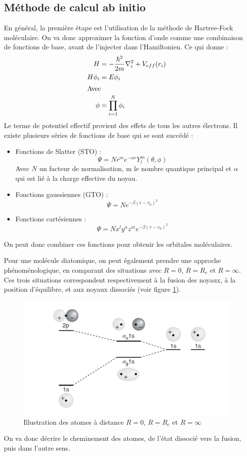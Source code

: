\subsection{Méthode de calcul ab initio}


En général, la première étape est l'utilisation de la méthode de Hartree-Fock moléculaire. On va donc approximer la fonction d'onde comme une combinaison de fonctions de base, avant de l'injecter dans l'Hamiltonien. Ce qui donne :
\begin{align*}
    H &= -\dfrac{\hbar^2}{2m}\nabla^2_i + V_{eff}(r_i)\\
    H\phi_i &= E\phi_i\\
    \intertext{Avec} 
    \phi &= \prod_{i=1}^N\phi_i
\end{align*}
Le terme de potentiel effectif provient des effets de tous les autres électrons. Il existe plusieurs séries de fonctions de base qui se sont succédé :

\begin{itemize}
    \item Fonctions de Slatter (STO) : 
    \[ \Psi = Nr^me^{-\alpha r}Y_l^m(\theta,\phi) \]
    Avec $N$ un facteur de normalisation, m le nombre quantique principal et $\alpha$ qui est lié à la charge effective du noyau.
    \item Fonctions gaussiennes (GTO) :
    \[ \Psi = Ne^{-\beta(r-r_0)^2} \]
    \item Fonctions cartésiennes :
    \[ \Psi = Nx^ly^nz^me^{-\beta(r-r_0)^2} \]
\end{itemize}
On peut donc combiner ces fonctions pour obtenir les orbitales moléculaires.


Pour une molécule diatomique, on peut également prendre une approche phénoménologique, en comparant des situations avec $R = 0$, $R = R_e$ et $R = \infty$. Ces trois situations correspondent respectivement à la fusion des noyaux, à la position d'équilibre, et aux noyaux dissociés (voir figure \ref{fig:Dist_mol}).
\begin{figure}
    \centering
    \includegraphics[scale=0.6]{Images3/Distance mol.PNG}
    \caption{Illustration des atomes à distance $R=0$, $R=R_e$ et $R=\infty$}
    \label{fig:Dist_mol}
\end{figure}
On va donc décrire le cheminement des atomes, de l'état dissocié vers la fusion, puis dans l'autre sens.




